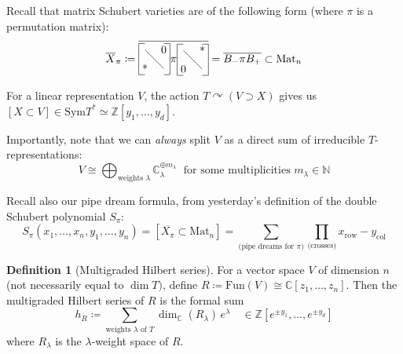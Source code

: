 \documentclass[12pt]{amsart}
\numberwithin{equation}{section}
\theoremstyle{definition}
\newtheorem{Definition}[equation]{Definition}
\numberwithin{figure}{section}
\newcommand{\C}{\mathbb{C}}
\newcommand{\bN}{\mathbb{N}}
\newcommand{\Z}{\mathbb{Z}}
\begin{document}

Recall that matrix Schubert varieties are of the following form (where $\pi$ is a permutation matrix): $$\overline{X}_{\pi} \coloneqq \overline{\vcenter{\hbox{\begin{tikzpicture}
\node at (.2,.2) {*};
\node at (.8,.8) {0};
\draw[-] (.2,.8) to (.8,.2);
\draw[-] (0,0) to (0,1);
\draw[-] (0,0) to (.2,0);
\draw[-] (0,1) to (.2,1);
\draw[-] (1,0) to (1,1);
\draw[-] (.8,0) to (1,0);
\draw [-] (.8,1) to (1,1);
\end{tikzpicture}}} \pi 
\vcenter{\hbox{\begin{tikzpicture}
\node at (.2,.2) {0};
\node at (.8,.8) {*};
\draw[-] (.2,.8) to (.8,.2);
\draw[-] (0,0) to (0,1);
\draw[-] (0,0) to (.2,0);
\draw[-] (0,1) to (.2,1);
\draw[-] (1,0) to (1,1);
\draw[-] (.8,0) to (1,0);
\draw [-] (.8,1) to (1,1);
\end{tikzpicture}}}} = \overline{B_- \pi B_+} \subset \text{Mat}_n$$

For a linear representation $V$, the action $T \curvearrowright (V \supset X)$ gives us $[X \subset V] \in \text{Sym}T^{\ast} \simeq \Z[y_1, \dots, y_d]$.

Importantly, note that we can \textit{always} split $V$ as a direct sum of irreducible $T$-representations: \\
$$V \cong \bigoplus_{\text{weights }\lambda} \C_{\lambda}^{\oplus m_{\lambda}} \; \text{ for some multiplicities } m_{\lambda} \in \bN$$


Recall also our pipe dream formula, from yesterday's definition of the double Schubert polynomial $S_{\pi}$:
$$S_{\pi}(x_1, \dots, x_n, y_1, \dots, y_n) = [\overline{X_{\pi}} \subset \text{Mat}_n] = \sum_{\text{(pipe dreams for } \pi)} \prod_{\text{(crosses)}}x_{\text{row}} - y_{\text{col}}$$

\vspace{1em}

\begin{Definition}[Multigraded Hilbert series]
For a vector space $V$ of dimension $n$ (not necessarily equal to $\dim T)$, define $R \coloneqq \text{Fun}(V) \cong \C[z_1, \dots, z_n]$. Then the multigraded Hilbert series of $R$ is the formal sum
$$ h_R \coloneqq \sum_{\text{weights } \lambda \text{ of } T} \dim_{\C}(R_{\lambda})\, e^{\lambda}  \quad \in \mathbb{Z}[e^{\pm y_1}, \dots, e^{\pm y_d}]$$
where $R_{\lambda}$ is the $\lambda$-weight space of $R$.
\end{Definition}
\end{document}
